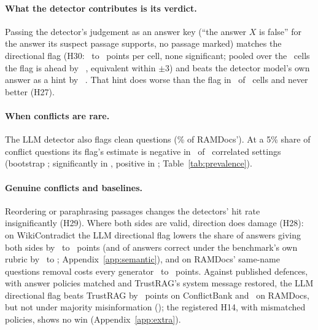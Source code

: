 \paragraph{What the detector contributes is its verdict.} Passing the detector's judgement as an answer key (``the
answer $X$ is false'' for the answer its suspect passage supports, no passage marked) matches the directional flag
(H30: \hThirtyAMin\ to \hThirtyAMax\ points per cell, none significant; pooled over the \PoolThirtyAK\ cells the flag
is ahead by \PoolThirtyA\ \PoolThirtyACI, equivalent within $\pm$3) and beats the detector model's own answer as a
hint by \PoolThirtyB\ \PoolThirtyBCI. That hint does worse than the flag in \nHTwentySevenAPos\ of
\nHTwentySevenATests\ cells and never better (H27).

\paragraph{When conflicts are rare.} The LLM detector also flags clean questions (\cleanFprLlm\% of RAMDocs'). At
a 5\% share of conflict questions its flag's estimate is negative in \prevNegFive\ of \prevN\ correlated settings
(bootstrap \prevNegFiveCI; significantly in \prevSigNeg, positive in \prevSigPos; Table~\ref{tab:prevalence}).

\paragraph{Genuine conflicts and baselines.} Reordering \citep{liu2024lost} or paraphrasing passages changes the
detectors' hit rate insignificantly (H29). Where both sides are valid, direction does damage (H28): on WikiContradict the LLM directional
flag lowers the share of answers giving both sides by \ahTwentyEightWcMiniDir\ to \ahTwentyEightWcLunaDir\ points
(and of answers correct under the benchmark's own rubric by \awikiOrigMiniEffPt\ to \awikiOrigLunaEffPt;
Appendix~\ref{app:semantic}), and on RAMDocs' same-name questions removal costs every generator
\ahTwentyEightAmbMiniRem\ to \ahTwentyEightAmbLunaRem\ points. Against published defences, with answer policies matched and TrustRAG's
system message restored, the LLM directional flag beats TrustRAG by \blHFourteenCbs\ points on ConflictBank and
\blHFourteenRd\ on RAMDocs, but not under majority misinformation (\blHFourteenMj); the registered H14, with
mismatched policies, shows no win (Appendix~\ref{app:extra}).
